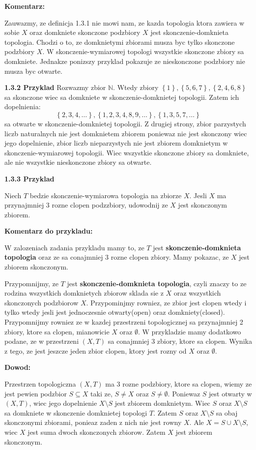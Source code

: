 \documentclass{article}
\begin{document}
\textbf{Komentarz:}

Zauwazmy, ze definicja 1.3.1 nie mowi nam, ze kazda topologia ktora zawiera w sobie $X$ oraz domkniete skonczone podzbiory $X$ jest skonczenie-domknieta topologia. Chodzi o to, ze domknietymi zbiorami musza byc tylko skonczone podzbiory $X$. W skonczenie-wymiarowej topologi wszystkie skonczone zbiory sa domkniete. Jednakze ponizszy przyklad pokazuje ze nieskonczone podzbiory nie musza byc otwarte.

\textbf{1.3.2 Przyklad} Rozwazmy zbior $\mathbb{N}$. Wtedy zbiory $\left\{ 1 \right\}, \left\{ 5,6,7 \right\}, \left\{ 2,4,6,8 \right\}$ sa skonczone wiec sa domkniete w skonczenie-domknietej topologii. Zatem ich dopelnienia:
$$\left\{ 2,3,4,\dots \right\}, \left\{ 1,2,3,4,8,9,\dots \right\}, \left\{ 1,3,5,7,\dots \right\}$$ sa otwarte w skonczenie-domknietej topologii. Z drugiej strony, zbior parzystych liczb naturalnych nie jest domknietem zbiorem poniewaz nie jest skonczony wiec jego dopelnienie, zbior liczb nieparzystych nie jest zbiorem domknietym w skonczenie-wymiarowej topologii. Wiec wszystkie skonczone zbiory sa domkniete, ale nie wszystkie nieskonczone zbiory sa otwarte. 

\textbf{1.3.3 Przyklad}

Niech $T$ bedzie skonczenie-wymiarowa topologia na zbiorze $X$. Jesli $X$ ma przynajmniej 3 rozne clopen podzzbiory, udowodnij ze $X$ jest skonczonym zbiorem.

\textbf{Komentarz do przykladu:}

W zalozeniach zadania przykladu mamy to, ze $T$ jest \textbf{skonczenie-domknieta topologia} oraz ze sa conajmniej 3 rozne clopen zbiory.
Mamy pokazac, ze $X$ jest zbiorem skonczonym.

Przypomnijmy, ze $T$ jest \textbf{skonczenie-domknieta topologia}, czyli znaczy to ze rodzina wszystkich domknietych zbiorow sklada sie z $X$ oraz wszystkich skonczonych podzbiorow $X$. Przypominjmy rowniez, ze zbior jest clopen wtedy i tylko wtedy jesli jest jednoczesnie otwarty(open) oraz domkniety(closed).
Przypomnijmy rowniez ze w kazdej przestrzeni topologicznej sa przynajmniej 2 zbiory, ktore sa clopen, mianowicie $X$ oraz $\emptyset$. W przykladzie mamy dodatkowo podane, ze w przestrzeni $(X,T)$ sa conajmniej 3 zbiory, ktore sa clopen. Wynika z tego, ze jest jeszcze jeden zbior clopen, ktory jest rozny od $X$ oraz $\emptyset$.

\textbf{Dowod:}

Przestrzen topologiczna $(X,T)$ ma 3 rozne podzbiory, ktore sa clopen, wiemy ze jest pewien podzbior $S \subseteq X$ taki ze, $S \neq X$ oraz $S \neq \emptyset$. Poniewaz $S$ jest otwarty w $(X, T)$, wiec jego dopelnienie $X \setminus S$ jest zbiorem domknietym. Wiec $S$ oraz $X \setminus S$ sa domkniete w skonczenie domknietej topologi $T$. Zatem $S$ oraz $X \setminus S$ sa obaj skonczonymi zbiorami, ponieaz zaden z nich nie jest rowny $X$. Ale $X = S \cup X\setminus S$, wiec $X$ jest suma dwoch skonczonych zbiorow. Zatem $X$ jest zbiorem skonczonym.
\end{document}
